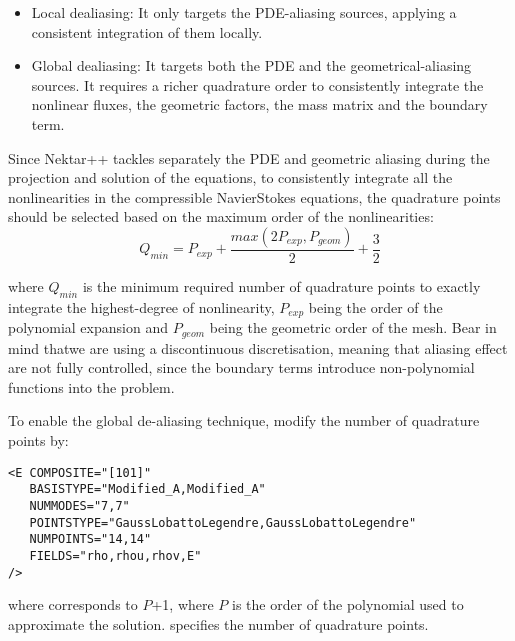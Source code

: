 \begin{itemize}
\item Local dealiasing: It only targets the PDE-aliasing sources, applying a consistent integration of them locally.
\item Global dealiasing: It targets both the PDE and the geometrical-aliasing sources. It requires a richer quadrature order to consistently integrate the nonlinear fluxes, the geometric factors, the mass matrix and the boundary term.
\end{itemize}

Since Nektar++ tackles separately the PDE and geometric aliasing during the
projection and solution of the equations, to consistently
integrate all the nonlinearities in the compressible
NavierStokes equations, the quadrature points should
be selected based on the maximum order of the nonlinearities:
\begin{equation}
Q_{min}= P_{exp}+\frac{max(2P_{exp},P_{geom})}{2} + \frac{3}{2}
\end{equation}

where $Q_{min}$ is the minimum required number of quadrature
points to exactly integrate the highest-degree of nonlinearity,
$P_{exp}$ being the order of the polynomial expansion and $P_{geom}$
being the geometric order of the mesh. Bear in mind thatwe are
using a discontinuous discretisation, meaning that aliasing
effect are not fully controlled, since the boundary terms
introduce non-polynomial functions into the problem.

To enable the global de-aliasing technique, modify the number of quadrature
points by:

\begin{lstlisting}[style=XmlStyle]
<E COMPOSITE="[101]"
   BASISTYPE="Modified_A,Modified_A"
   NUMMODES="7,7"
   POINTSTYPE="GaussLobattoLegendre,GaussLobattoLegendre"
   NUMPOINTS="14,14"
   FIELDS="rho,rhou,rhov,E"
/>
\end{lstlisting}

where  corresponds to $P$+1, where $P$ is the order of the polynomial
used to approximate the solution.  specifies the number of quadrature
points.
